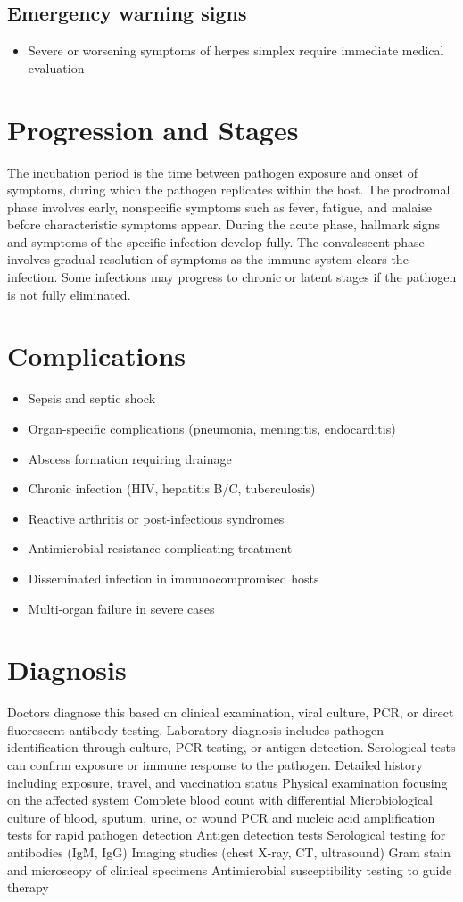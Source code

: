 \subsection{Emergency warning signs}
\begin{itemize}[noitemsep]
  \item Severe or worsening symptoms of herpes simplex require immediate medical evaluation
\end{itemize}
\section{Progression and Stages}
The incubation period is the time between pathogen exposure and onset of symptoms, during which the pathogen replicates within the host. The prodromal phase involves early, nonspecific symptoms such as fever, fatigue, and malaise before characteristic symptoms appear. During the acute phase, hallmark signs and symptoms of the specific infection develop fully. The convalescent phase involves gradual resolution of symptoms as the immune system clears the infection. Some infections may progress to chronic or latent stages if the pathogen is not fully eliminated.
\section{Complications}
\begin{itemize}[noitemsep]
  \item Sepsis and septic shock
  \item Organ-specific complications (pneumonia, meningitis, endocarditis)
  \item Abscess formation requiring drainage
  \item Chronic infection (HIV, hepatitis B/C, tuberculosis)
  \item Reactive arthritis or post-infectious syndromes
  \item Antimicrobial resistance complicating treatment
  \item Disseminated infection in immunocompromised hosts
  \item Multi-organ failure in severe cases
\end{itemize}
\section{Diagnosis}
Doctors diagnose this based on clinical examination, viral culture, PCR, or direct fluorescent antibody testing. Laboratory diagnosis includes pathogen identification through culture, PCR testing, or antigen detection. Serological tests can confirm exposure or immune response to the pathogen. Detailed history including exposure, travel, and vaccination status Physical examination focusing on the affected system Complete blood count with differential Microbiological culture of blood, sputum, urine, or wound PCR and nucleic acid amplification tests for rapid pathogen detection Antigen detection tests Serological testing for antibodies (IgM, IgG) Imaging studies (chest X-ray, CT, ultrasound) Gram stain and microscopy of clinical specimens Antimicrobial susceptibility testing to guide therapy

